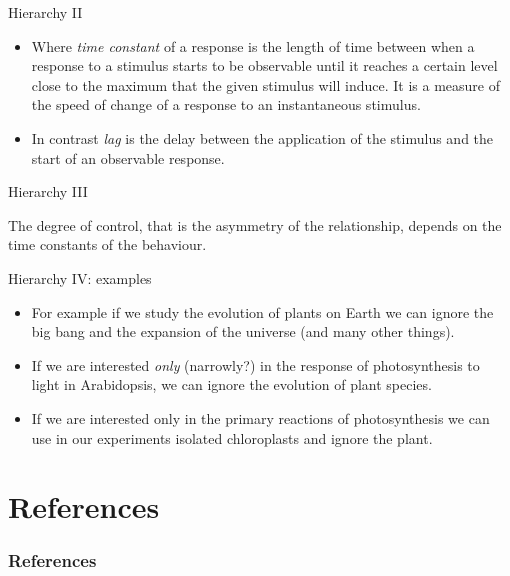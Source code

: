 \documentclass[10pt]{beamer}
\begin{document}
\begin{frame}{Hierarchy II}
\begin{itemize}
\item Where \textit{time constant} of a response is the length of time
between when a response to a stimulus starts to be observable until
it reaches a certain level close to the maximum that the given
stimulus will induce. It is a measure of the speed of change of a
response to an instantaneous stimulus.

\item In contrast \textit{lag} is the delay between the application of
the stimulus and the start of an observable response.
\end{itemize}
\end{frame}

\begin{frame}{Hierarchy III}

The degree of control, that is the asymmetry of the relationship,
depends on the time constants of the behaviour.

  

 \DExamples{}

\end{frame}

\begin{frame}{Hierarchy IV: examples}
\begin{itemize}
\item For example if we study the evolution of plants on Earth we can
ignore the big bang and the expansion of the universe (and many
other things).

\item If we are interested \emph{only} (narrowly?) in the response of photosynthesis to light
in Arabidopsis, we can ignore the evolution of plant species.

\item If we are interested only in the primary reactions of photosynthesis
we can use in our experiments isolated chloroplasts and ignore the
plant.
\end{itemize}
\end{frame}

\section*{References}
\nocite{Chamovitz2017,Denison2012,Karban2015,Keddy2017,Manetas2012}
\nocite{Sadras2021,Sadras2014a}
  \begin{frame}[t,allowframebreaks]
    \frametitle{References}
    \printbibliography
  \end{frame}
\end{document}
